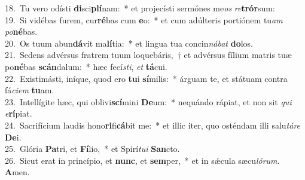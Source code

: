 {18.~}Tu vero odísti \textbf{di}sci\textbf{plí}nam:~* et projecísti sermónes me\textit{os} \textit{re}\textbf{trór}sum:\\
{19.~}Si vidébas furem, cur\textbf{ré}bas cum \textbf{e}o:~* et cum adúlteris portiónem tu\textit{am} \textit{po}\textbf{né}bas.\\
{20.~}Os tuum abun\textbf{dá}vit ma\textbf{lí}tia:~* et lingua tua concin\textit{ná}\textit{bat} \textbf{do}los.\\
{21.~}Sedens advérsus fratrem tuum loquebáris,~† et advérsus fílium matris tuæ po\textbf{né}bas \textbf{scán}dalum:~* hæc fecí\textit{sti}, \textit{et} \textbf{tá}cui.\\
{22.~}Existimásti, iníque, quod ero \textbf{tu}i \textbf{sí}milis:~* árguam te, et státuam contra fá\textit{ci}\textit{em} \textbf{tu}am.\\
{23.~}Intellígite hæc, qui oblivi\textbf{scí}mini \textbf{De}um:~* nequándo rápiat, et non sit \textit{qui} \textit{e}\textbf{rí}piat.\\
{24.~}Sacrifícium laudis hono\textbf{ri}fi\textbf{cá}bit me:~* et illic iter, quo osténdam illi salu\textit{tá}\textit{re} \textbf{De}i.\\
{25.~}Glória \textbf{Pa}tri, et \textbf{Fí}lio,~* et Spirí\textit{tu}\textit{i} \textbf{San}cto.\\
{26.~}Sicut erat in princípio, et \textbf{nunc}, et \textbf{sem}per,~* et in sǽcula sæcu\textit{ló}\textit{rum}. \textbf{A}men.\\
